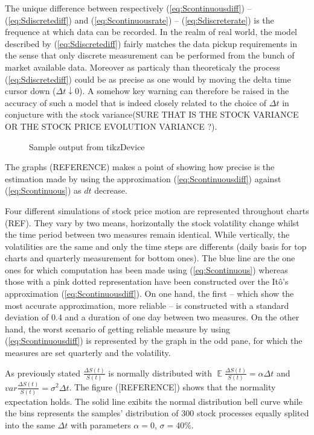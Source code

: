 \documentclass[12pt]{report}
\newcommand{\Dt}{\Delta t}
\newcommand{\E}{\mathop{\mathbb{E}}}
\newcommand{\St}{S\left(t\right)}
\newcommand{\DSt}{\Delta S\left(t\right)}
\newcommand{\DSr}{\frac{\DSt}{\St}}
\newcommand{\Sdiscreterateexp}{\E \DSr = \alpha \Dt}
\newcommand{\Sdiscreteratevar}{var \DSr = \sigma ^2 \Dt}
\begin{document}
The unique difference between respectively (\ref{eq:Scontinuousdiff}) -- (\ref{eq:Sdiscretediff}) and (\ref{eq:Scontinuousrate}) -- (\ref{eq:Sdiscreterate}) is the frequence at which data can be recorded.
In the realm of real world, the model described by (\ref{eq:Sdiscretediff}) fairly matches the data pickup requirements in the sense that only discrete measurement can be performed from the bunch of market available data.
Moreover as particaly than theoreticaly the process (\ref{eq:Sdiscretediff}) could be as precise as one would by moving the delta time cursor down ($\Delta t \downarrow 0$).
A somehow key warning can therefore be raised in the accuracy of such a model that is indeed closely related to the choice of $\Delta t$ in conjucture with the stock variance(SURE THAT IS THE STOCK VARIANCE OR THE STOCK PRICE EVOLUTION VARIANCE ?).



\begin{figure}[h!]
\centering

\caption{Sample output from tikzDevice}
\label{plot:test}
\end{figure}


The graphs (REFERENCE) makes a point of showing how precise is the estimation made by using the approximation (\ref{eq:Scontinuousdiff}) against (\ref{eq:Scontinuous}) as $dt$ decrease.
   
Four different simulations of stock price motion are represented throughout charts (REF). They vary by two means, horizontally the stock volatility change whilst the time period between two measures remain identical. While vertically, the volatilities are the same and only the time steps are differents (daily basis for top charts and quarterly measurement for bottom ones).
The blue line are the one ones for which computation has been made using (\ref{eq:Scontinuous}) whereas those with a pink dotted representation have been constructed over the Itô's approximation (\ref{eq:Scontinuousdiff}).
On one hand, the first -- which show the most accurate approximation, more reliable -- is constructed with a standard deviation of 0.4 and a duration of one day between two measures.
On the other hand, the worst scenario of getting reliable measure by using (\ref{eq:Scontinuousdiff}) is represented by the graph in the odd pane, for which the measures are set quarterly and the volatility.

As previously stated $\DSr$ is normally distributed with $\Sdiscreterateexp$ and $\Sdiscreteratevar$. The figure ([REFERENCE]) shows that the normality expectation holds. The solid line exibits the normal distribution bell curve while the bins represents the samples' distribution of 300 stock processes equally splited into the same $\Dt$ with parameters $\alpha = 0$, $\sigma = 40\%$.
\end{document}
